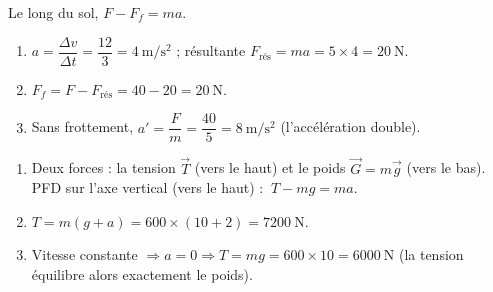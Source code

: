 \documentclass[11pt,a4paper]{article}
\newcommand{\vv}[1]{\vec{#1}}\newcommand{\ds}{\displaystyle}
\begin{document}
\begin{corrige}
Le long du sol, $F-F_f=ma$.
\begin{enumerate}[label=\alph*)]
  \item $a=\dfrac{\Delta v}{\Delta t}=\dfrac{12}{3}=\qty{4}{\metre\per\second\squared}$ ; résultante
        $F_{\text{rés}}=ma=5\times 4=\qty{20}{\newton}$.
  \item $F_f=F-F_{\text{rés}}=40-20=\qty{20}{\newton}$.
  \item Sans frottement, $a'=\dfrac{F}{m}=\dfrac{40}{5}=\qty{8}{\metre\per\second\squared}$ (l'accélération double).
\end{enumerate}
\end{corrige}

\begin{corrige}
\begin{enumerate}[label=\alph*)]
  \item Deux forces : la tension $\vv T$ (vers le haut) et le poids $\vv G=m\vv g$ (vers le bas).
        PFD sur l'axe vertical (vers le haut) : $\ T-mg=ma$.
  \item $T=m(g+a)=600\times(10+2)=\qty{7200}{\newton}$.
  \item Vitesse constante $\Rightarrow a=0 \Rightarrow T=mg=600\times 10=\qty{6000}{\newton}$
        (la tension équilibre alors exactement le poids).
\end{enumerate}
\end{corrige}
\end{document}
